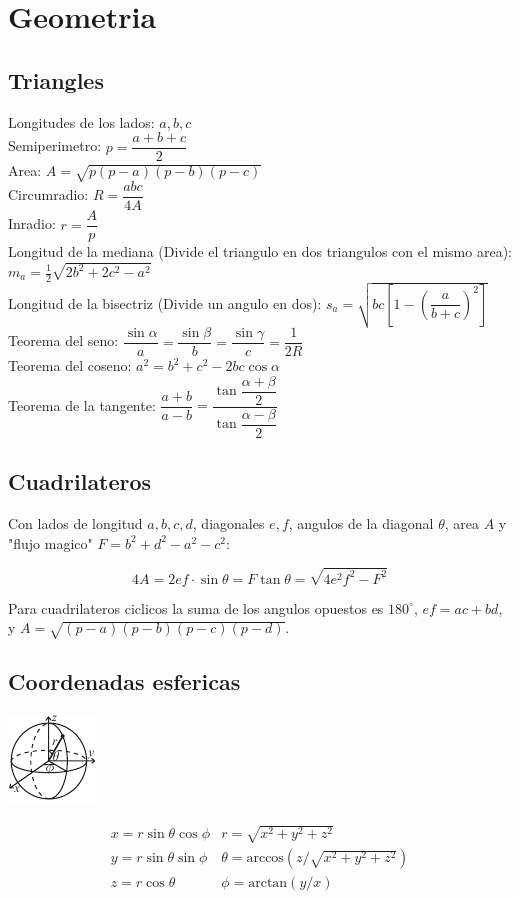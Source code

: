 \section{Geometria}

\subsection{Triangles}
Longitudes de los lados: $a,b,c$\\
Semiperimetro: $p=\dfrac{a+b+c}{2}$\\
Area: $A=\sqrt{p(p-a)(p-b)(p-c)}$\\
Circumradio: $R=\dfrac{abc}{4A}$\\
Inradio: $r=\dfrac{A}{p}$\\
Longitud de la mediana (Divide el triangulo en dos triangulos con el mismo area): $m_a=\tfrac{1}{2}\sqrt{2b^2+2c^2-a^2}$\\
Longitud de la bisectriz (Divide un angulo en dos): $s_a=\sqrt{bc\left[1-\left(\dfrac{a}{b+c}\right)^2\right]}$\\
Teorema del seno: $\dfrac{\sin\alpha}{a}=\dfrac{\sin\beta}{b}=\dfrac{\sin\gamma}{c}=\dfrac{1}{2R}$\\
Teorema del coseno: $a^2=b^2+c^2-2bc\cos\alpha$\\
Teorema de la tangente: $\dfrac{a+b}{a-b}=\dfrac{\tan\dfrac{\alpha+\beta}{2}}{\tan\dfrac{\alpha-\beta}{2}}$\\



\subsection{Cuadrilateros}

Con lados de longitud $a,b,c,d$, diagonales $e, f$, angulos de la diagonal $\theta$, area $A$ y "flujo magico" $F=b^2+d^2-a^2-c^2$:

$$4A = 2ef \cdot \sin\theta = F\tan\theta = \sqrt{4e^2f^2-F^2} $$

Para cuadrilateros ciclicos la suma de los angulos opuestos es $180^\circ$,
$ef = ac + bd$, y $A = \sqrt{(p-a)(p-b)(p-c)(p-d)}$.

\subsection{Coordenadas esfericas}
\begin{center}
\includegraphics{content/math/sphericalCoordinates}
\end{center}
\[\begin{array}{cc}
x = r\sin\theta\cos\phi & r = \sqrt{x^2+y^2+z^2}\\
y = r\sin\theta\sin\phi & \theta = \textrm{arccos}(z/\sqrt{x^2+y^2+z^2})\\
z = r\cos\theta & \phi = \textrm{arctan}(y/x)
\end{array}\]

